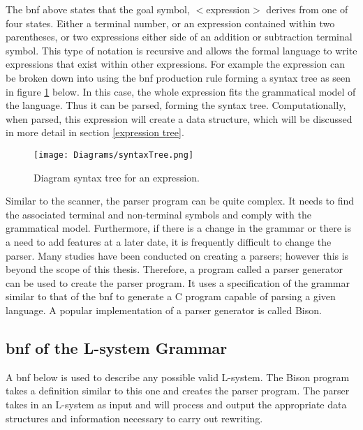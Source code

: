 \noindent
The \acrshort{bnf} above states that the goal symbol, $<$expression$>$ derives from one of four states. Either a terminal number, or an expression contained within two parentheses, or two expressions either side of an addition or subtraction terminal symbol. This type of notation is recursive and allows the formal language to write expressions that exist within other expressions. For example the expression  can be broken down into using the \acrshort{bnf} production rule forming a syntax tree as seen in figure \ref{syntax tree} below. In this case, the whole expression fits the grammatical model of the language. Thus it can be parsed, forming the syntax tree. Computationally, when parsed, this expression will create a data structure, which will be discussed in more detail in section \ref{expression tree}.

\begin{figure}[htbp]
	{\centering
		\vspace{7px}
		
		\texttt{[image: Diagrams/syntaxTree.png]}
		
		\caption{Diagram syntax tree for an expression.} \label{syntax tree}
	}
\end{figure}
\FloatBarrier

\noindent
Similar to the scanner, the parser program can be quite complex. It needs to find the associated terminal and non-terminal symbols and comply with the grammatical model. Furthermore, if there is a change in the grammar or there is a need to add features at a later date, it is frequently difficult to change the parser. Many studies have been conducted on creating a parsers; however this is beyond the scope of this thesis. Therefore, a program called a parser generator can be used to create the parser program. It uses a specification of the grammar similar to that of the \acrshort{bnf} to generate a C program capable of parsing a given language. A popular implementation of a parser generator is called Bison.

\subsection{\acrlong{bnf} of the L-system Grammar} \label{L-system Grammar}

A \acrshort{bnf} below is used to describe any possible valid L-system. The Bison program takes a definition similar to this one and creates the parser program. The parser takes in an L-system as input and will process and output the appropriate data structures and information necessary to carry out rewriting.

